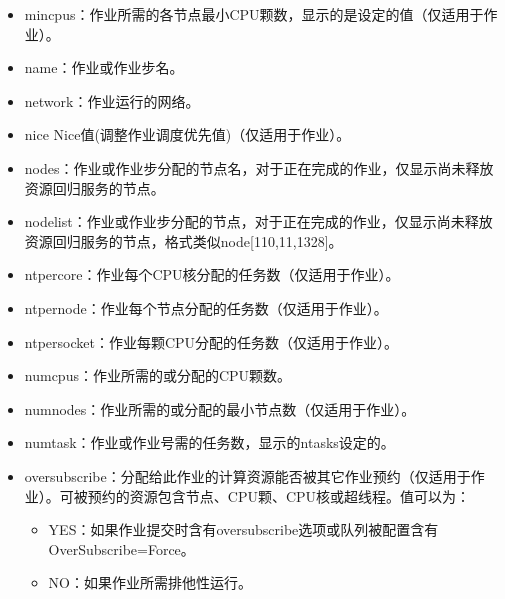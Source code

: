 \documentclass[a4paper,12pt,english]{sphinxmanual}
\begin{document}
\begin{itemize}
\begin{itemize}
\begin{itemize}
\item {} 
\sphinxAtStartPar
mincpus：作业所需的各节点最小CPU颗数，显示的是设定的值（仅适用于作业）。

\item {} 
\sphinxAtStartPar
name：作业或作业步名。

\item {} 
\sphinxAtStartPar
network：作业运行的网络。

\item {} 
\sphinxAtStartPar
nice Nice值(调整作业调度优先值)（仅适用于作业）。

\item {} 
\sphinxAtStartPar
nodes：作业或作业步分配的节点名，对于正在完成的作业，仅显示尚未释放资源回归服务的节点。

\item {} 
\sphinxAtStartPar
nodelist：作业或作业步分配的节点，对于正在完成的作业，仅显示尚未释放资源回归服务的节点，格式类似node{[}1\sphinxhyphen{}10,11,13\sphinxhyphen{}28{]}。

\item {} 
\sphinxAtStartPar
ntpercore：作业每个CPU核分配的任务数（仅适用于作业）。

\item {} 
\sphinxAtStartPar
ntpernode：作业每个节点分配的任务数（仅适用于作业）。

\item {} 
\sphinxAtStartPar
ntpersocket：作业每颗CPU分配的任务数（仅适用于作业）。

\item {} 
\sphinxAtStartPar
numcpus：作业所需的或分配的CPU颗数。

\item {} 
\sphinxAtStartPar
numnodes：作业所需的或分配的最小节点数（仅适用于作业）。

\item {} 
\sphinxAtStartPar
numtask：作业或作业号需的任务数，显示的\sphinxhyphen{}\sphinxhyphen{}ntasks设定的。

\item {} 
\sphinxAtStartPar
oversubscribe：分配给此作业的计算资源能否被其它作业预约（仅适用于作业）。可被预约的资源包含节点、CPU颗、CPU核或超线程。值可以为：
\begin{itemize}
\item {} 
\sphinxAtStartPar
YES：如果作业提交时含有oversubscribe选项或队列被配置含有OverSubscribe=Force。

\item {} 
\sphinxAtStartPar
NO：如果作业所需排他性运行。


\end{itemize}
\end{itemize}
\end{itemize}
\end{itemize}
\end{document}

